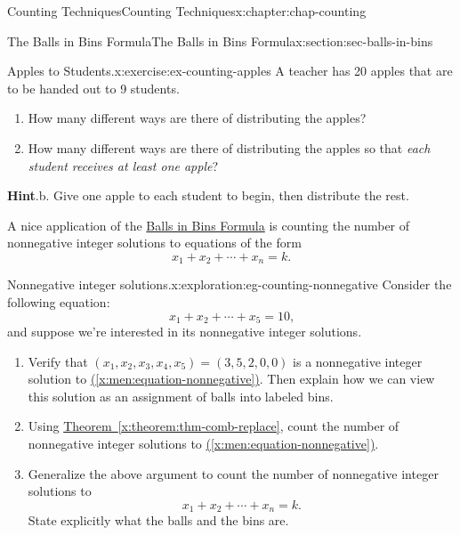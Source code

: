 \documentclass[oneside,10pt,]{book}
\newcommand{\blocktitlefont}{\relax}
\newcommand{\xreffont}{\relax}
\numberwithin{equation}{section}
\begin{document}
\begin{chapterptx}{Counting Techniques}{}{Counting Techniques}{}{}{x:chapter:chap-counting}
\begin{sectionptx}{The Balls in Bins Formula}{}{The Balls in Bins Formula}{}{}{x:section:sec-balls-in-bins}
\begin{inlineexercise}{Apples to Students.}{x:exercise:ex-counting-apples}
A teacher has 20 apples that are to be handed out to 9 students.%
\begin{enumerate}[label=(\alph*)]
\item{}How many different ways are there of distributing the apples?%
\item{}How many different ways are there of distributing the apples so that \emph{each student receives at least one apple}?%
\end{enumerate}
%
\par\smallskip%
\noindent\textbf{\blocktitlefont Hint}.\hypertarget{g:hint:id224715}{}\quad{}b. Give one apple to each student to begin, then distribute the rest.%
\end{inlineexercise}
A nice application of the \hyperref[x:theorem:thm-comb-replace]{Balls in Bins Formula} is counting the number of nonnegative integer solutions to equations of the form%
\begin{equation*}
x_1 + x_2 + \cdots + x_n = k\text{.}
\end{equation*}
%
\begin{exploration}{Nonnegative integer solutions.}{x:exploration:eg-counting-nonnegative}%
Consider the following equation:%
\begin{equation}
x_1 + x_2 + \cdots + x_5 = 10\text{,}\label{x:men:equation-nonnegative}
\end{equation}
and suppose we're interested in its nonnegative integer solutions.%
\begin{enumerate}[font=\bfseries,label=(\alph*),ref=\alph*]
\item{}Verify that \((x_1,x_2,x_3,x_4,x_5) = (3,5,2,0,0)\) is a nonnegative integer solution to \hyperref[x:men:equation-nonnegative]{({\xreffont\ref{x:men:equation-nonnegative}})}. Then explain how we can view this solution as an assignment of balls into labeled bins.%
\item{}Using \hyperref[x:theorem:thm-comb-replace]{Theorem~{\xreffont\ref{x:theorem:thm-comb-replace}}}, count the number of nonnegative integer solutions to \hyperref[x:men:equation-nonnegative]{({\xreffont\ref{x:men:equation-nonnegative}})}.%
\item{}Generalize the above argument to count the number of nonnegative integer solutions to%
\begin{equation*}
x_1 + x_2 + \cdots + x_n = k\text{.}
\end{equation*}
State explicitly what the balls and the bins are.%
\end{enumerate}
\end{exploration}

\end{sectionptx}
\end{chapterptx}
\end{document}
